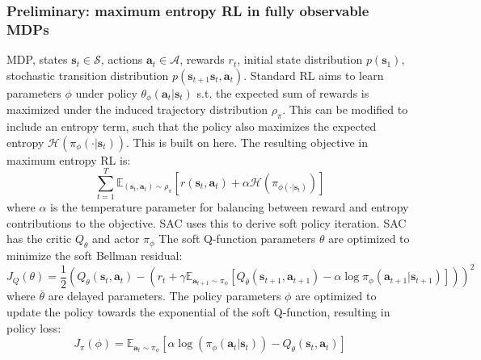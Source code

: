 \documentclass{article}
\begin{document}
\subsubsection{Preliminary: maximum entropy RL in fully observable MDPs}
MDP, states $ \bm{s}_{t} \in \mathcal{S}  $, actions $ \bm{a}_{t} \in \mathcal{A}  $,
rewards $ r_{ t }  $, initial state distribution $ p (\bm{s}_{1})  $,
stochastic transition distribution $ p (\bm{s}_{t+1}  \bm{s}_{t}, \bm{a}_{t} )  $.
Standard RL aims to learn parameters $ \phi  $ under policy
$ \theta_{ \phi } (\bm{a}_{t}| \bm{s}_{t} )  $ s.t. the expected
sum of rewards is maximized under the induced trajectory distribution $ \rho_{ \pi }  $.
This can be modified to include an entropy term, such that the policy also maximizes
the expected entropy $ \mathcal{H} (\pi_{ \phi } (\cdot|\bm{s}_{t}))  $.
This is built on here.
The resulting objective in maximum entropy RL is:
\begin{equation}
		\sum_{t=1}^{T} \mathbb{E}_{ (\bm{s}_{t}, \bm{a}_{t} ) \sim \rho_{ \pi } }
		\left[ 
r (\bm{s}_{t}, \bm{a}_{t} ) + \alpha \mathcal{H} (\pi_{ \phi (\cdot| \bm{s}_{t}) })
		\right] 
\end{equation}
where $ \alpha  $ is the temperature parameter for balancing between reward and entropy contributions 
to the objective.
SAC uses this to derive soft policy iteration.
SAC has the critic $ Q_{ \theta }  $ and actor $ \pi_{ \phi }  $
The soft Q-function parameters $ \theta  $ are optimized to minimize the soft Bellman residual:
\begin{equation}
J_{ Q } (\theta) =
\frac{1}{2} \left( 
Q_{ \theta } (\bm{s}_{t}, \bm{a}_{t} ) -
\left( 
r_{ t } + \gamma \mathbb{E}_{ \bm{a}_{t+1} \sim \pi_{ \phi } }
\left[ 
		Q_{ \bar{\theta} } (\bm{s}_{t+1}, \bm{a}_{t+1} ) -
		\alpha \log \pi_{ \phi } (\bm{a}_{t+1}| \bm{s}_{t+1} )
\right] 
\right) 
\right)^{ 2 } 
\end{equation}
where $ \bar{\theta}  $ are delayed parameters.
The policy parameters $ \phi  $ are optimized to update the policy towards the exponential of the soft Q-function,
resulting in policy loss:
\begin{equation}
		J_{ \pi } (\phi) =
		\mathbb{E}_{ \bm{a}_{t} \sim \pi_{ \phi } } 
		\left[ 
\alpha \log (\pi_{ \phi } (\bm{a}_{t}| \bm{s}_{t} )) - Q_{ \theta } (\bm{s}_{t}, \bm{a}_{t} )
		\right] 
\end{equation}
\end{document}
